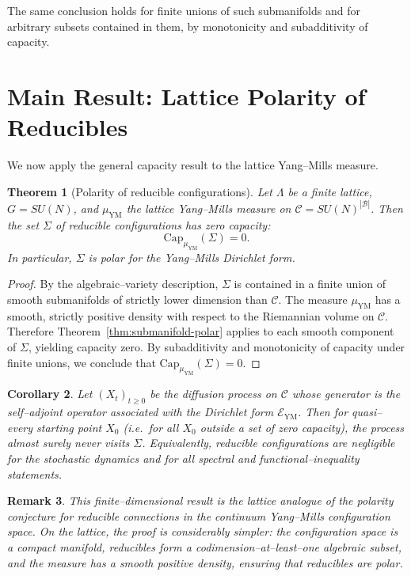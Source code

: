 \documentclass[11pt]{article}
\newtheorem{theorem}{Theorem}[section]
\newtheorem{corollary}[theorem]{Corollary}
\newtheorem{remark}[theorem]{Remark}
\begin{document}
The same conclusion holds for finite unions of such submanifolds and for
arbitrary subsets contained in them, by monotonicity and subadditivity
of capacity.

\section{Main Result: Lattice Polarity of Reducibles}

We now apply the general capacity result to the lattice Yang--Mills
measure.

\begin{theorem}[Polarity of reducible configurations]
Let $\Lambda$ be a finite lattice, $G=SU(N)$, and $\mu_{\mathrm{YM}}$
the lattice Yang--Mills measure on $\mathcal{C}=SU(N)^{|\mathcal{B}|}$.
Then the set $\Sigma$ of reducible configurations has zero capacity:
\begin{equation}
  \mathrm{Cap}_{\mu_{\mathrm{YM}}}(\Sigma) = 0.
\end{equation}
In particular, $\Sigma$ is polar for the Yang--Mills Dirichlet form.
\end{theorem}

\begin{proof}
By the algebraic--variety description, $\Sigma$ is contained in a finite
union of smooth submanifolds of strictly lower dimension than
$\mathcal{C}$.  The measure $\mu_{\mathrm{YM}}$ has a smooth, strictly
positive density with respect to the Riemannian volume on
$\mathcal{C}$.  Therefore Theorem~\ref{thm:submanifold-polar} applies to
each smooth component of $\Sigma$, yielding capacity zero.  By
subadditivity and monotonicity of capacity under finite unions, we
conclude that $\mathrm{Cap}_{\mu_{\mathrm{YM}}}(\Sigma)=0$.
\end{proof}

\begin{corollary}
Let $(X_t)_{t\ge 0}$ be the diffusion process on $\mathcal{C}$ whose
generator is the self--adjoint operator associated with the Dirichlet
form $\mathcal{E}_{\mathrm{YM}}$.  Then for quasi--every starting point
$X_0$ (i.e.\ for all $X_0$ outside a set of zero capacity), the process
almost surely never visits $\Sigma$.  Equivalently, reducible
configurations are negligible for the stochastic dynamics and for all
spectral and functional--inequality statements.
\end{corollary}

\begin{remark}
This finite--dimensional result is the lattice analogue of the polarity
conjecture for reducible connections in the continuum Yang--Mills
configuration space.  On the lattice, the proof is considerably simpler:
the configuration space is a compact manifold, reducibles form a
codimension--at--least--one algebraic subset, and the measure has a
smooth positive density, ensuring that reducibles are polar.
\end{remark}
\end{document}
